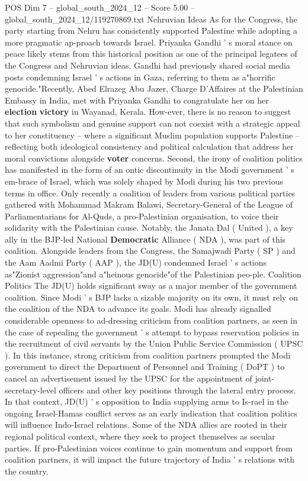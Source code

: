 \begin{textsample}{POS Dim 7 – global\_south\_2024\_12 – Score 5.00 – global\_south\_2024\_12/119270869.txt}
Nehruvian Ideas As for the Congress, the party starting from Nehru has consistently supported Palestine while adopting a more pragmatic ap-proach towards Israel.
Priyanka Gandhi ' s moral stance on peace likely stems from this historical position as one of the principal legatees of the Congress and Nehruvian ideas.
Gandhi had previously shared social media posts condemning Israel ' s actions in Gaza, referring to them as a"horrific genocide."Recently, Abed Elrazeg Abu Jazer, Charge D'Affaires at the Palestinian Embassy in India, met with Priyanka Gandhi to congratulate her on her \textbf{election} \textbf{victory} in Wayanad, Kerala.
How-ever, there is no reason to suggest that such symbolism and genuine support can not coexist with a strategic appeal to her constituency -- where a significant Muslim population supports Palestine -- reflecting both ideological consistency and political calculation that address her moral convictions alongside \textbf{voter} concerns.
Second, the irony of coalition politics has manifested in the form of an ontic discontinuity in the Modi government ' s em-brace of Israel, which was solely shaped by Modi during his two previous terms in office.
Only recently a coalition of leaders from various political parties gathered with Mohammad Makram Balawi, Secretary-General of the League of Parliamentarians for Al-Quds, a pro-Palestinian organisation, to voice their solidarity with the Palestinian cause.
Notably, the Janata Dal ( United ), a key ally in the BJP-led National \textbf{Democratic} Alliance ( NDA ), was part of this coalition.
Alongside leaders from the Congress, the Samajwadi Party ( SP ) and the Aam Aadmi Party ( AAP ), the JD(U) condemned Israel ' s actions as"Zionist aggression"and a"heinous genocide"of the Palestinian peo-ple.
Coalition Politics The JD(U) holds significant sway as a major member of the government coalition.
Since Modi ' s BJP lacks a sizable majority on its own, it must rely on the coalition of the NDA to advance its goals.
Modi has already signalled considerable openness to ad-dressing criticism from coalition partners, as seen in the case of repealing the government ' s attempt to bypass reservation policies in the recruitment of civil servants by the Union Public Service Commission ( UPSC ).
In this instance, strong criticism from coalition partners prompted the Modi government to direct the Department of Personnel and Training ( DoPT ) to cancel an advertisement issued by the UPSC for the appointment of joint-secretary-level officers and other key positions through the lateral entry process.
In that context, JD(U) ' s opposition to India supplying arms to Is-rael in the ongoing Israel-Hamas conflict serves as an early indication that coalition politics will influence Indo-Israel relations.
Some of the NDA allies are rooted in their regional political context, where they seek to project themselves as secular parties.
If pro-Palestinian voices continue to gain momentum and support from coalition partners, it will impact the future trajectory of India ' s relations with the country.

\end{textsample}
